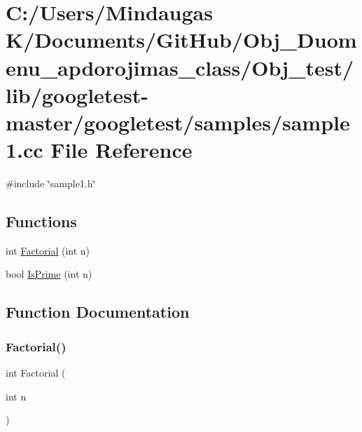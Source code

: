 \hypertarget{_obj__test_2lib_2googletest-master_2googletest_2samples_2sample1_8cc}{}\section{C\+:/\+Users/\+Mindaugas K/\+Documents/\+Git\+Hub/\+Obj\+\_\+\+Duomenu\+\_\+apdorojimas\+\_\+class/\+Obj\+\_\+test/lib/googletest-\/master/googletest/samples/sample1.cc File Reference}
\label{_obj__test_2lib_2googletest-master_2googletest_2samples_2sample1_8cc}
{\ttfamily \#include \char`\"{}sample1.\+h\char`\"{}}\newline
\subsection*{Functions}
\begin{DoxyCompactItemize}
\item 
int \mbox{\hyperlink{_obj__test_2lib_2googletest-master_2googletest_2samples_2sample1_8cc_a0e7da4d7a69c5b5afb707807aa177017}{Factorial}} (int n)
\item 
bool \mbox{\hyperlink{_obj__test_2lib_2googletest-master_2googletest_2samples_2sample1_8cc_a7093217f5edc11fe277d03bd064e5f11}{Is\+Prime}} (int n)
\end{DoxyCompactItemize}


\subsection{Function Documentation}
\mbox{\label{_obj__test_2lib_2googletest-master_2googletest_2samples_2sample1_8cc_a0e7da4d7a69c5b5afb707807aa177017}} 
\subsubsection{\texorpdfstring{Factorial()}{Factorial()}}
{\footnotesize\ttfamily int Factorial (\begin{DoxyParamCaption}\item[{int}]{n }\end{DoxyParamCaption})}

